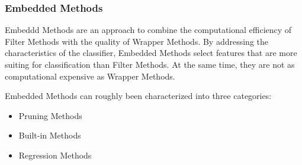 \subsubsection{Embedded Methods}
\label{sec:methods.flat.embedded}

 
Embeddd Methods are an approach to combine the computational efficiency of
Filter Methods with the quality of Wrapper Methods.
By addressing the characteristics of the classifier, Embedded Methods select
features that are more suiting for classification than Filter Methods. At the
same time, they are not as computational expensive as Wrapper Methods.
  
Embedded Methods can roughly been characterized into three categories:

\begin{itemize}
  \item Pruning Methods
  \item Built-in Methods
  \item Regression Methods
\end{itemize}

 







